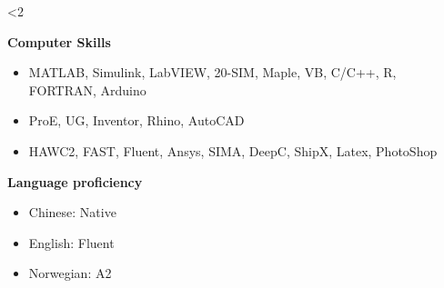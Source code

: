 \documentclass[10pt]{ctexart}
\begin{document}
\ifnum\value{num}<2 {
    \textbf{Computer Skills}
    \begin{itemize}[label={}]
    \item MATLAB, Simulink, LabVIEW, 20-SIM, Maple, VB, C/C++, R, FORTRAN, Arduino
    \item ProE, UG, Inventor, Rhino, AutoCAD
    \item HAWC2, FAST, Fluent, Ansys, SIMA, DeepC, ShipX, Latex, PhotoShop
    \end{itemize}
    \vspace*{0.5em}
    
    \textbf{Language proficiency}
    \begin{itemize}[label={}] \setlength\itemsep{0.5em}
    \item Chinese: Native
    \item English: Fluent
    \item Norwegian: A2
    \end{itemize}
    \vspace*{0.5em}
}\else{

}\fi
\end{document}

